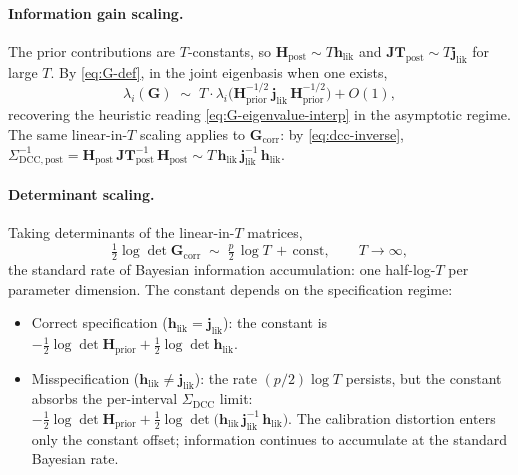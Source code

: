 \documentclass[11pt]{article}
\begin{document}
\paragraph{Information gain scaling.}
The prior contributions are $T$-constants, so $\mathbf H_{\mathrm{post}} \sim T \mathbf h_{\mathrm{lik}}$ and $\mathbf{JT}_{\mathrm{post}} \sim T \mathbf j_{\mathrm{lik}}$ for large $T$. By \eqref{eq:G-def}, in the joint eigenbasis when one exists,
\begin{equation}
\lambda_i(\mathbf G)
\;\sim\;
T \cdot \lambda_i\bigl(\mathbf H_{\mathrm{prior}}^{-1/2}\, \mathbf j_{\mathrm{lik}}\, \mathbf H_{\mathrm{prior}}^{-1/2}\bigr) + O(1),
\label{eq:G-eigenvalue-scaling}
\end{equation}
recovering the heuristic reading \eqref{eq:G-eigenvalue-interp} in the asymptotic regime. The same linear-in-$T$ scaling applies to $\mathbf G_{\mathrm{corr}}$: by \eqref{eq:dcc-inverse}, $\Sigma_{\mathrm{DCC},\mathrm{post}}^{-1} = \mathbf H_{\mathrm{post}}\, \mathbf{JT}_{\mathrm{post}}^{-1}\, \mathbf H_{\mathrm{post}} \sim T\, \mathbf h_{\mathrm{lik}}\, \mathbf j_{\mathrm{lik}}^{-1}\, \mathbf h_{\mathrm{lik}}$.

\paragraph{Determinant scaling.}
Taking determinants of the linear-in-$T$ matrices,
\begin{equation}
\tfrac{1}{2} \log \det \mathbf G_{\mathrm{corr}}
\;\sim\;
\tfrac{p}{2}\,\log T \,+\, \mathrm{const},
\qquad T \to \infty,
\label{eq:logdetGcorr-scaling}
\end{equation}
the standard rate of Bayesian information accumulation: one half-log-$T$ per parameter dimension. The constant depends on the specification regime:
\begin{itemize}
\item Correct specification ($\mathbf h_{\mathrm{lik}} = \mathbf j_{\mathrm{lik}}$): the constant is $-\tfrac{1}{2}\log\det \mathbf H_{\mathrm{prior}} + \tfrac{1}{2}\log\det \mathbf h_{\mathrm{lik}}$.
\item Misspecification ($\mathbf h_{\mathrm{lik}} \neq \mathbf j_{\mathrm{lik}}$): the rate $(p/2)\log T$ persists, but the constant absorbs the per-interval $\Sigma_{\mathrm{DCC}}$ limit: $-\tfrac{1}{2}\log\det \mathbf H_{\mathrm{prior}} + \tfrac{1}{2}\log\det\bigl(\mathbf h_{\mathrm{lik}}\, \mathbf j_{\mathrm{lik}}^{-1}\, \mathbf h_{\mathrm{lik}}\bigr)$. The calibration distortion enters only the constant offset; information continues to accumulate at the standard Bayesian rate.
\end{itemize}
\end{document}
